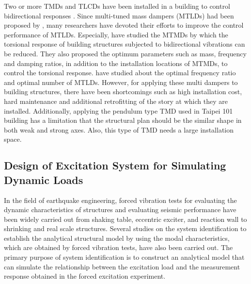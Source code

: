 Two or more TMDs and TLCDs have been installed in a building to control bidirectional responses\citep{xu1992dynamic, fujino1993vibration, yamaguchi1993fundamental, igusa1994vibration, jangid1997performance, li2000performance, li2000optimum, singh2002tuned} . Since multi-tuned mass dampers (MTLDs) had been proposed by \citet{xu1992dynamic,igusa1994vibration}, many researchers have devoted their efforts to improve the control performance of MTLDs\citep{fujino1993vibration, yamaguchi1993fundamental, jangid1997performance, li2000performance, li2000optimum, singh2002tuned, zhang2004equivalent}. Especially, \citet{jangid1997performance, singh2002tuned} have studied the MTMDs by which the torsional response of building structures subjected to bidirectional vibrations can be reduced. They also proposed the optimum parameters such as mass, frequency and damping ratios, in addition to the installation locations of MTMDs, to control the torsional response. \citet{fujino1993vibration} have studied about the optimal frequency ratio and optimal number of MTLDs. However, for applying these multi dampers to building structures, there have been shortcomings such as high installation cost, hard maintenance and additional retrofitting of the story at which they are installed. Additionally, applying the pendulum type TMD used in Taipei 101 building has a limitation that the structural plan should be the similar shape in both weak and strong axes. Also, this type of TMD needs a large installation space\citep{haskett2004tuned}.

\subsection{Design of Excitation System for Simulating Dynamic Loads}

In the field of earthquake engineering, forced vibration tests for evaluating the dynamic characteristics of structures and evaluating seismic performance have been widely carried out from shaking table, eccentric exciter, and reaction wall to shrinking and real scale structures.
Several studies on the system identification to establish the analytical structural model by using the modal characteristics, which are obtained by forced vibration tests, have also been carried out\citep{halling2001dynamic,min2004vibration}.
The primary purpose of system identification is to construct an analytical model that can simulate the relationship between the excitation load and the measurement response obtained in the forced excitation experiment.

